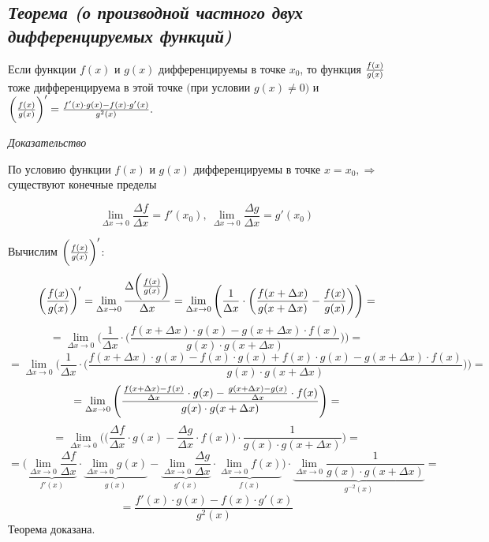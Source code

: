 \subsection{\textit{Теорема (о производной частного двух дифференцируемых функций)}}

Если функции $f(x)$ и $g(x)$ дифференцируемы в точке $x_0$, то функция ${\Large\frac{f(x)}{g(x)}}$ тоже дифференцируема в этой точке $\big($при условии $g(x) \neq 0\big)$ и $\bigg({\Large\frac{f(x)}{g(x)}}\bigg)' = {\Large\frac{f'(x)\cdot g(x) - f(x)\cdot g'(x)}{g^2(x)}}.$

\textit{Доказательство}

По условию функции $f(x)$ и $g(x)$ дифференцируемы в точке $x = x_0, \Rightarrow$ существуют конечные пределы

$$\lim\limits_{\Delta x \rightarrow 0}\frac{\Delta f}{\Delta x} = f'(x_0), \ \lim\limits_{\Delta x \rightarrow 0}\frac{\Delta g}{\Delta x} = g'(x_0)$$

Вычислим $\bigg({\Large\frac{f(x)}{g(x)}}\bigg)'$: $$\bigg({\frac{f(x)}{g(x)}}\bigg)' = \lim\limits_{\Delta x \rightarrow 0} {\frac{\Delta\bigg({\Large\frac{f(x)}{g(x)}}\bigg)}{\Delta x}}
= \lim\limits_{\Delta x \rightarrow 0}\Bigg( \frac{1}{\Delta x}\cdot\bigg({\frac{f(x + \Delta x)}{g(x + \Delta x)}}-{\frac{f(x)}{g(x)}}\bigg)\Bigg) 
=$$ $$=\lim\limits_{\Delta x \rightarrow 0}\Bigg( \frac{1}{\Delta x}\cdot\bigg({\frac{f(x + \Delta x)\cdot g(x)-g(x + \Delta x)\cdot f(x)}{g(x)\cdot g(x + \Delta x)}}\bigg)\Bigg)
=$$ $$=\lim\limits_{\Delta x \rightarrow 0}\Bigg( \frac{1}{\Delta x}\cdot\bigg({\frac{f(x + \Delta x)\cdot g(x) - f(x)\cdot g(x) + f(x)\cdot g(x) -g(x + \Delta x)\cdot f(x)}{g(x)\cdot g(x + \Delta x)}}\bigg)\Bigg) 
=$$ $$=\lim\limits_{\Delta x \rightarrow 0}\Bigg( {\frac{{\Large\frac{f(x + \Delta x) - f(x)}{\Delta x}}\cdot g(x) -  {\Large\frac{g(x + \Delta x) - g(x)}{\Delta x}}\cdot f(x)}{g(x)\cdot g(x + \Delta x)}}\Bigg) 
=$$ $$=\lim\limits_{\Delta x \rightarrow 0}\Bigg(\bigg({\frac{\Delta f}{\Delta x}}\cdot g(x) -  {\frac{\Delta g}{\Delta x}}\cdot f(x)\bigg)\cdot\frac{1}{g(x)\cdot g(x + \Delta x)}\Bigg) 
=$$ $$=\Bigg(\underbrace{\lim\limits_{\Delta x \rightarrow 0}{\frac{\Delta f}{\Delta x}}}_{f'(x)}\cdot \underbrace{\lim\limits_{\Delta x \rightarrow 0}g(x)}_{g(x)} -  \underbrace{\lim\limits_{\Delta x \rightarrow 0}{\frac{\Delta g}{\Delta x}}}_{g'(x)}\cdot \underbrace{\lim\limits_{\Delta x \rightarrow 0}f(x)}_{f(x)}\Bigg)\cdot\underbrace{\lim\limits_{\Delta x \rightarrow 0}\frac{1}{g(x)\cdot g(x + \Delta x)}}_{g^{-2}(x)}
=$$ $$= {\frac{f'(x)\cdot g(x) - f(x)\cdot g'(x)}{g^2(x)}}$$ Теорема доказана.
\newpage 

